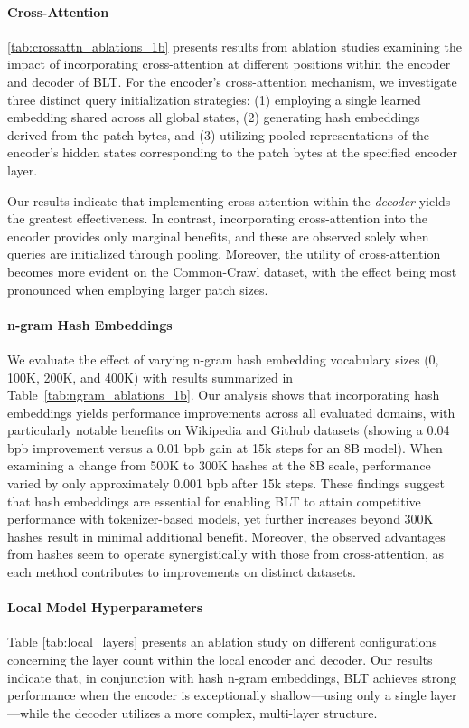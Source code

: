 \paragraph{Cross-Attention} 
\autoref{tab:crossattn_ablations_1b} presents results from ablation studies examining the impact of incorporating cross-attention at different positions within the encoder and decoder of {\textsc BLT}. For the encoder's cross-attention mechanism, we investigate three distinct query initialization strategies: (1) employing a single learned embedding shared across all global states, (2) generating hash embeddings derived from the patch bytes, and (3) utilizing pooled representations of the encoder's hidden states corresponding to the patch bytes at the specified encoder layer.

Our results indicate that implementing cross-attention within the \textit{decoder} yields the greatest effectiveness. In contrast, incorporating cross-attention into the encoder provides only marginal benefits, and these are observed solely when queries are initialized through pooling. Moreover, the utility of cross-attention becomes more evident on the Common-Crawl dataset, with the effect being most pronounced when employing larger patch sizes.

\paragraph{n-gram Hash Embeddings} 

We evaluate the effect of varying n-gram hash embedding vocabulary sizes (0, 100K, 200K, and 400K) with results summarized in Table~\ref{tab:ngram_ablations_1b}. Our analysis shows that incorporating hash embeddings yields performance improvements across all evaluated domains, with particularly notable benefits on Wikipedia and Github datasets (showing a 0.04 bpb improvement versus a 0.01 bpb gain at 15k steps for an 8B model). When examining a change from 500K to 300K hashes at the 8B scale, performance varied by only approximately 0.001 bpb after 15k steps. These findings suggest that hash embeddings are essential for enabling {\textsc BLT} to attain competitive performance with tokenizer-based models, yet further increases beyond 300K hashes result in minimal additional benefit. Moreover, the observed advantages from hashes seem to operate synergistically with those from cross-attention, as each method contributes to improvements on distinct datasets.

\paragraph{Local Model Hyperparameters} Table \ref{tab:local_layers} presents an ablation study on different configurations concerning the layer count within the local encoder and decoder. Our results indicate that, in conjunction with hash n-gram embeddings, {\textsc BLT} achieves strong performance when the encoder is exceptionally shallow—using only a single layer—while the decoder utilizes a more complex, multi-layer structure.

